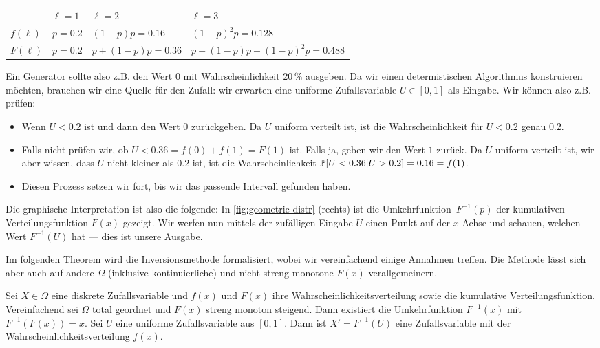 \begin{center}
    \begin{tabular}{l|p{}p{}p{}}
                  & $\ell = 1$ & $\ell = 2$              & $\ell = 3$                              \\\hline\hline
        $f(\ell)$ & $p =0.2$   & $(1 {-} p)p = 0.16$     & $(1 {-} p)^2p = 0.128$                  \\
        $F(\ell)$ & $p =0.2$   & $p{+}(1 {-} p)p = 0.36$ & $p{+}(1 {-} p)p{+}(1 {-} p)^2p = 0.488$
    \end{tabular}
\end{center}
\vspace{1em}


Ein Generator sollte also z.B. den Wert $0$ mit Wahrscheinlichkeit 20\,\% ausgeben.
Da wir einen determistischen Algorithmus konstruieren möchten, brauchen wir eine Quelle für den Zufall:
wir erwarten eine uniforme Zufallsvariable $U \in [0, 1]$ als Eingabe.
Wir können also z.B. prüfen:
\begin{itemize}
    \item Wenn $U < 0.2$ ist und dann den Wert $0$ zurückgeben.
          Da $U$ uniform verteilt ist, ist die Wahrscheinlichkeit für $U < 0.2$ genau $0.2$.

    \item Falls nicht prüfen wir, ob $U < 0.36 = f(0) + f(1) = F(1)$ ist. Falls ja, geben wir den Wert $1$ zurück.
          Da $U$ uniform verteilt ist, wir aber wissen, dass $U$ nicht kleiner als $0.2$ ist, ist die Wahrscheinlichkeit $\mathbb{P}\!\left[U < 0.36 | U > 0.2\right] = 0.16 = f(1)$.

    \item Diesen Prozess setzen wir fort, bis wir das passende Intervall gefunden haben.
\end{itemize}

Die graphische Interpretation ist also die folgende:
In \cref{fig:geometric-distr} (rechts) ist die Umkehrfunktion~$F^{-1}(p)$ der kumulativen Verteilungsfunktion $F(x)$ gezeigt.
Wir werfen nun mittels der zufälligen Eingabe $U$ einen Punkt auf der $x$-Achse und schauen, welchen Wert $F^{-1}(U)$ hat --- dies ist unsere Ausgabe.

Im folgenden Theorem wird die Inversionsmethode formalisiert, wobei wir vereinfachend einige Annahmen treffen.
Die Methode lässt sich aber auch auf andere $\Omega$ (inklusive kontinuierliche) und nicht streng monotone $F(x)$ verallgemeinern.

\begin{theorem}
    Sei $X \in \Omega$ eine diskrete Zufallsvariable und $f(x)$ und $F(x)$ ihre Wahrscheinlichkeitsverteilung sowie die kumulative Verteilungsfunktion.
    Vereinfachend sei $\Omega$ total geordnet und $F(x)$ streng monoton steigend.
    Dann existiert die Umkehrfunktion $F^{-1}(x)$ mit $F^{-1}(F(x)) = x$.
    Sei $U$ eine uniforme Zufallsvariable aus $[0, 1]$.
    Dann ist $X' = F^{-1}(U)$ eine Zufallsvariable mit der Wahrscheinlichkeitsverteilung $f(x)$.
\end{theorem}

